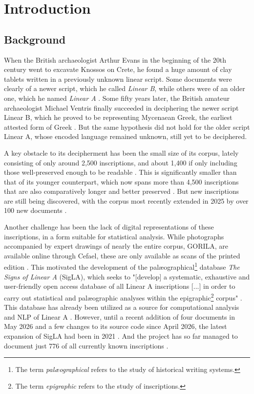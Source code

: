 \chapter{Introduction}

\section{Background}

When the British archaeologist Arthur Evans in the beginning of the 20th century went to excavate Knossos on Crete, he found a huge amount of clay tablets written in a previously unknown linear script.
Some documents were clearly of a newer script, which he called \textit{Linear B}, while others were of an older one, which he named \textit{Linear A} \parencite{Salgarella2020}.
Some fifty years later, the British amateur archaeologist Michael Ventris finally succeeded in deciphering the newer script Linear B, which he proved to be representing Mycenaean Greek, the earliest attested form of Greek \parencite{VentrisChadwick1956}.
But the same hypothesis did not hold for the older script Linear A, whose encoded language remained unknown, still yet to be deciphered.

A key obstacle to its decipherment has been the small size of its corpus, lately consisting of only around 2,500 inscriptions, and about 1,400 if only including those well-preserved enough to be readable \parencite[p.~13]{Salgarella2025}.
This is significantly smaller than that of its younger counterpart, which now spans more than 4,500 inscriptions that are also comparatively longer and better preserved \parencite[p.~46]{Salgarella2025}.
But new inscriptions are still being discovered, with the corpus most recently extended in 2025 by over 100 new documents \parencite{RILA-S1,CNRLinearACorpus2025}.

Another challenge has been the lack of digital representations of these inscriptions, in a form suitable for statistical analysis.
While photographs accompanied by expert drawings of nearly the entire corpus, \acf{GORILA}, are available online through \acf{Cefael}, these are only available as scans of the printed edition \parencite{EtudesCretoises21}.
This motivated the development of the palæographical\footnote{The term \textit{palæographical} refers to the study of historical writing systems.} database \textit{The Signs of Linear A} (SigLA), which seeks to "[develop] a systematic, exhaustive and user-friendly open access database of all Linear A inscriptions [...] in order to carry out statistical and palæographic analyses within the epigraphic\footnote{The term \textit{epigraphic} refers to the study of inscriptions.} corpus" \parencite{SalgarellaCastellanSigLA2020}.
This database has already been utilized as a source for computational analysis and \acf{NLP} of Linear A \parencite{LogogramNLP}.
However, until a recent addition of four documents in May 2026 and a few changes to its source code since April 2026, the latest expansion of SigLA had been in 2021 \parencite{SigLAAboutPage,SigilGitLab}. 
And the project has so far managed to document just 776 of all currently known inscriptions \parencite{SigLASearchDocuments}.

